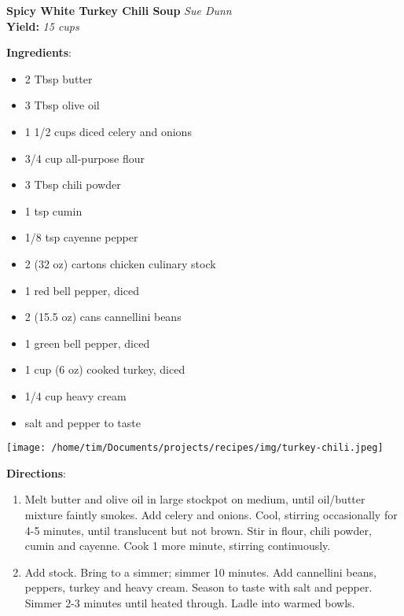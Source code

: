\documentclass[11pt, twoside, openany]{book}
\begin{document}
\noindent\begin{minipage}[t]{\linewidth}%
{\Large\textbf{Spicy White Turkey Chili Soup}} \label{spicy-white-turkey-chili-soup}\hfill\textit{Sue Dunn}\\
\textbf{Yield:} \textit{15 cups}\\
\noindent\begin{minipage}[t]{0.78\linewidth}%
\textbf{Ingredients}:\vspace{-3mm}
\begin{multicols}{2}
\begin{itemize}\setlength\itemsep{-1mm}
\item 2 Tbsp butter
\item 3 Tbsp olive oil
\item 1 1/2 cups diced celery and onions
\item 3/4 cup all-purpose flour
\item 3 Tbsp chili powder
\item 1 tsp cumin
\item 1/8 tsp cayenne pepper
\item 2 (32 oz) cartons chicken culinary stock
\item 1 red bell pepper, diced
\item 2 (15.5 oz) cans cannellini beans
\item 1 green bell pepper, diced
\item 1 cup (6 oz) cooked turkey, diced
\item 1/4 cup heavy cream
\item salt and pepper to taste
\end{itemize}
\end{multicols}
\end{minipage}
\noindent\begin{minipage}[t]{0.18\linewidth}
\centering \strut\vspace*{-\baselineskip}\newline
\texttt{[image: /home/tim/Documents/projects/recipes/img/turkey-chili.jpeg]}\\
\end{minipage}\vspace{3mm}
\textbf{Directions}:
\vspace{-3mm}\begin{enumerate}\setlength\itemsep{-1mm}
\item Melt butter and olive oil in large stockpot on medium, until oil/butter mixture faintly smokes. Add celery and onions. Cool, stirring occasionally for 4-5 minutes, until translucent but not brown. Stir in flour, chili powder, cumin and cayenne. Cook 1 more minute, stirring continuously.
\item Add stock. Bring to a simmer; simmer 10 minutes. Add cannellini beans, peppers, turkey and heavy cream. Season to taste with salt and pepper. Simmer 2-3 minutes until heated through. Ladle into warmed bowls.
\end{enumerate}
\end{minipage}\vspace{8mm}
\end{document}
